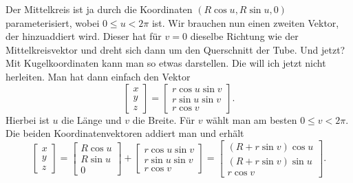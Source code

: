 \documentclass[a4paper,12pt,fleqn,dvipdfmx]{article}
\begin{document}
Der Mittelkreis ist ja durch die Koordinaten $(R\cos u,R\sin u,0)$
parameterisiert, wobei $0\le u<2\pi$ ist. Wir brauchen nun
einen zweiten Vektor, der hinzuaddiert wird. Dieser hat für $v=0$
dieselbe Richtung wie der Mittelkreisvektor und dreht sich dann um
den Querschnitt der Tube. Und jetzt? Mit Kugelkoordinaten kann man
so etwas darstellen. Die will ich jetzt nicht herleiten. Man hat
dann einfach den Vektor
\begin{equation}
\begin{bmatrix}
x\\ y\\ z
\end{bmatrix}
= \begin{bmatrix}
r\cos u\sin v\\
r\sin u\sin v\\
r\cos v
\end{bmatrix}.
\end{equation}
Hierbei ist $u$ die Länge und $v$ die Breite. Für $v$ wählt man
am besten $0\le v<2\pi$. Die beiden Koordinatenvektoren addiert man
und erhält
\begin{equation}\label{Torus}
\begin{bmatrix}
x\\ y\\ z
\end{bmatrix}
= \begin{bmatrix}
R\cos u\\
R\sin u\\
0
\end{bmatrix}+\begin{bmatrix}
r\cos u\sin v\\
r\sin u\sin v\\
r\cos v
\end{bmatrix}
= \begin{bmatrix}
(R+r\sin v)\cos u\\
(R+r\sin v)\sin u\\
r\cos v
\end{bmatrix}.
\end{equation}
\end{document}

